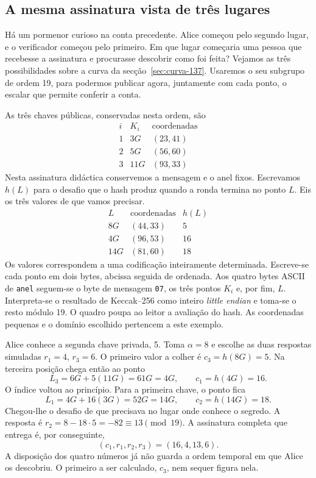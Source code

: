 \subsection{A mesma assinatura vista de três lugares}
\label{sec:anel-tres-lugares}

Há um pormenor curioso na conta precedente. Alice começou pelo segundo
lugar, e o verificador começou pelo primeiro. Em que lugar começaria
uma pessoa que recebesse a assinatura e procurasse descobrir como foi
feita? Vejamos as três possibilidades sobre a curva da
secção~\ref{sec:curva-137}. Usaremos o seu subgrupo de ordem 19, para
podermos publicar agora, juntamente com cada ponto, o escalar que
permite conferir a conta.

As três chaves públicas, conservadas nesta ordem, são
\[
\begin{array}{c|c|c}
 i&K_i&\text{coordenadas}\\ \hline
 1&3G &(23,41)\\
 2&5G &(56,60)\\
 3&11G&(93,33)
\end{array}
\]
Nesta assinatura didáctica conservemos a mensagem e o anel fixos.
Escrevamos \(h(L)\) para o desafio que o hash produz quando a ronda
termina no ponto \(L\). Eis os três valores de que vamos precisar.
\[
\begin{array}{c|c|c}
 L&\text{coordenadas}&h(L)\\ \hline
 8G &(44,33)&5\\
 4G &(96,53)&16\\
 14G&(81,60)&18
\end{array}
\]
Os valores correspondem a uma codificação inteiramente determinada.
Escreve-se cada ponto em dois bytes, abcissa seguida de ordenada.
Aos quatro bytes ASCII de \texttt{anel} seguem-se o byte de mensagem
\texttt{07}, os três pontos \(K_i\) e, por fim, \(L\). Interpreta-se
o resultado de Keccak--256 como inteiro \emph{little endian} e toma-se
o resto módulo 19. O quadro poupa ao leitor a avaliação do hash. As
coordenadas pequenas e o domínio escolhido pertencem a este exemplo.

Alice conhece a segunda chave privada, 5. Toma \(\alpha=8\) e escolhe
as duas respostas simuladas \(r_1=4\), \(r_3=6\). O primeiro valor
a colher é \(c_3=h(8G)=5\). Na terceira posição chega então ao ponto
\[
       L_3=6G+5(11G)=61G=4G,
       \qquad c_1=h(4G)=16 .
\]
O índice voltou ao princípio. Para a primeira chave, o ponto fica
\[
       L_1=4G+16(3G)=52G=14G,
       \qquad c_2=h(14G)=18 .
\]
Chegou-lhe o desafio de que precisava no lugar onde conhece o segredo.
A resposta é \(r_2=8-18\cdot5=-82\equiv13\pmod{19}\).
A assinatura completa que entrega é, por conseguinte,
\[
                (c_1,r_1,r_2,r_3)=(16,4,13,6).
\]
A disposição dos quatro números já não guarda a ordem temporal em que
Alice os descobriu. O primeiro a ser calculado, \(c_3\), nem sequer
figura nela.

